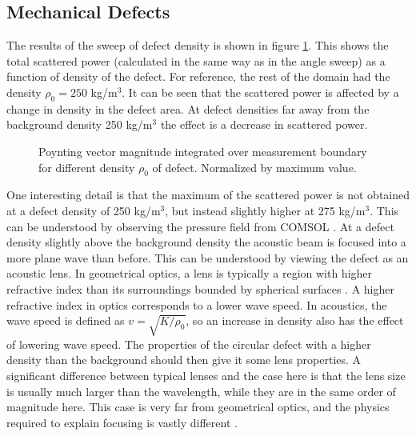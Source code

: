 \documentclass[11pt,twoside]{eitExjobb}
\begin{document}
%			
	
	\subsection{Mechanical Defects}
	The results of the sweep of defect density is shown in figure \ref{fig:res-mech-power}. This shows the total scattered power (calculated in the same way as in the angle sweep) as a function of density of the defect. For reference, the rest of the domain had the density $\rho_0 = 250$ kg/m$^3$. It can be seen that the scattered power is affected by a change in density in the defect area. At defect densities far away from the background density 250 kg/m$^3$ the effect is a decrease in scattered power.
	
	\begin{figure}[h]
		\centering
		\resizebox{\textwidth}{!}{
			
		}
		\caption{\label{fig:res-mech-power} Poynting vector magnitude integrated over measurement boundary for different density $\rho_0$ of defect. Normalized by maximum value.}
	\end{figure}
	
	One interesting detail is that the maximum of the scattered power is not obtained at a defect density of 250 kg/m$^3$, but instead slightly higher at 275 kg/m$^3$. This can be understood by observing the pressure field from COMSOL . At a defect density slightly above the background density the acoustic beam is focused into a more plane wave than before. This can be understood by viewing the defect as an acoustic lens. In geometrical optics, a lens is typically a region with higher refractive index than its surroundings bounded by spherical surfaces \cite{Saleh2007}. A higher refractive index in optics corresponds to a lower wave speed. In acoustics, the wave speed is defined as $v = \sqrt{K/\rho_0}$, so an increase in density also has the effect of lowering wave speed. The properties of the circular defect with a higher density than the background should then give it some lens properties. A significant difference between typical lenses and the case here is that the lens size is usually much larger than the wavelength, while they are in the same order of magnitude here. This case is very far from geometrical optics, and the physics required to explain focusing is vastly different \cite{Fletcher2001}.
	
\end{document}
